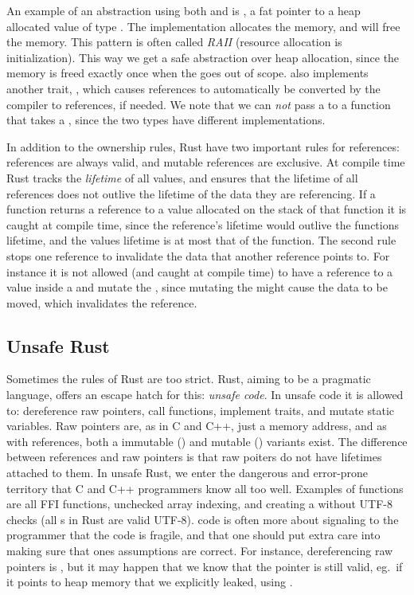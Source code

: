 \documentclass[b5paper]{report}
\begin{document}
An example of an abstraction using both  and  is
, a fat pointer to a heap allocated value of type
. The  implementation allocates the memory, and 
will free the memory. This pattern is often called \emph{RAII} (resource
allocation is initialization). This way we get a safe abstraction over heap
allocation, since the memory is freed exactly once when the  goes out
of scope.   also implements another trait, , which
causes  references to automatically be converted by the compiler to
 references, if needed. We note that we can \emph{not} pass a
 to a function that takes a , since the two types have
different  implementations.

In addition to the ownership rules, Rust have two important rules for
references: references are always valid, and mutable references are exclusive.
At compile time Rust tracks the \emph{lifetime} of all values, and ensures that
the lifetime of all references does not outlive the lifetime of the data they
are referencing. If a function returns a reference to a value allocated on the
stack of that function it is caught at compile time, since the reference's
lifetime would outlive the functions lifetime, and the values lifetime is at
most that of the function. The second rule stops one reference to invalidate the
data that another reference points to. For instance it is not allowed (and
caught at compile time) to have a reference to a value inside a  and
mutate the , since mutating the  might cause the data to be
moved, which invalidates the reference.

\subsection{Unsafe Rust}

Sometimes the rules of Rust are too strict. Rust, aiming to be a pragmatic
language, offers an escape hatch for this: \emph{unsafe code}. In unsafe code it
is allowed to: dereference raw pointers, call  functions, implement
 traits, and mutate static variables. Raw pointers are, as in C and
C++, just a memory address, and as with references, both a immutable
() and mutable () variants exist. The difference
between references and raw pointers is that raw poiters do not have lifetimes
attached to them. In unsafe Rust, we enter the dangerous and error-prone
territory that C and C++ programmers know all too well. Examples of
 functions are all FFI functions, unchecked array indexing, and
creating a  without UTF-8 checks (all s in Rust are
valid UTF-8).  code is often more about signaling to the programmer
that the code is fragile, and that one should put extra care into making sure
that ones assumptions are correct. For instance, dereferencing raw pointers is
, but it may happen that we know that the pointer is still valid,
eg.\ if it points to heap memory that we explicitly leaked, using
.
\end{document}
